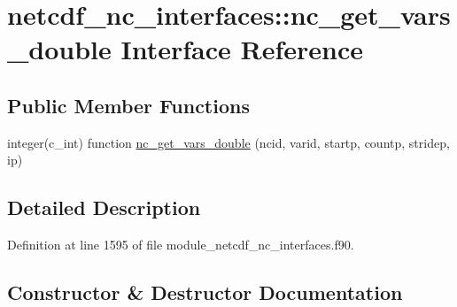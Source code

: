 \hypertarget{interfacenetcdf__nc__interfaces_1_1nc__get__vars__double}{}\section{netcdf\+\_\+nc\+\_\+interfaces\+:\+:nc\+\_\+get\+\_\+vars\+\_\+double Interface Reference}
\label{interfacenetcdf__nc__interfaces_1_1nc__get__vars__double}
\subsection*{Public Member Functions}
\begin{DoxyCompactItemize}
\item 
integer(c\+\_\+int) function \hyperlink{interfacenetcdf__nc__interfaces_1_1nc__get__vars__double_a6b3326923b173d537b9f3384475e7d8d}{nc\+\_\+get\+\_\+vars\+\_\+double} (ncid, varid, startp, countp, stridep, ip)
\end{DoxyCompactItemize}


\subsection{Detailed Description}


Definition at line 1595 of file module\+\_\+netcdf\+\_\+nc\+\_\+interfaces.\+f90.



\subsection{Constructor \& Destructor Documentation}
\mbox{\label{interfacenetcdf__nc__interfaces_1_1nc__get__vars__double_a6b3326923b173d537b9f3384475e7d8d}} 
